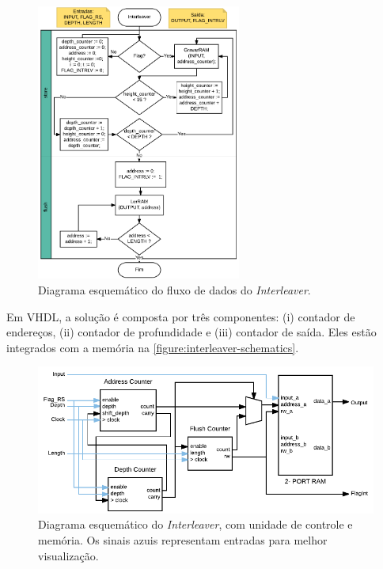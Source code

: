 	\begin{figure}[h!]
		\caption{\label{figure:interleaver-flow}Diagrama esquemático do fluxo de dados do \textit{Interleaver}.}
		\centering
		\includegraphics[width=0.6\textwidth]{interleaver/flow.pdf}
	\end{figure}
	
	Em VHDL, a solução é composta por três componentes: (i) contador de endereços, (ii) contador de profundidade e (iii) contador de saída. Eles estão integrados com a memória na \autoref{figure:interleaver-schematics}.
		
	\begin{figure}[h!]
		\caption{\label{figure:interleaver-schematics}Diagrama esquemático do \textit{Interleaver}, com unidade de controle e memória. Os sinais azuis representam entradas para melhor visualização.}
		\centering
		\includegraphics[width=1\textwidth]{interleaver/schematics.pdf}
	\end{figure}

